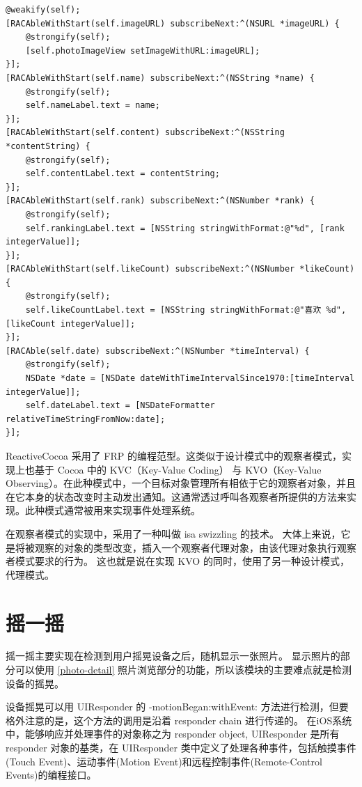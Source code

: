 \begin{minipage}{\textwidth}
\begin{lstlisting}[caption=排行榜中的数据绑定,label=ranking-rack]
@weakify(self);
[RACAbleWithStart(self.imageURL) subscribeNext:^(NSURL *imageURL) {
    @strongify(self);
    [self.photoImageView setImageWithURL:imageURL];
}];
[RACAbleWithStart(self.name) subscribeNext:^(NSString *name) {
    @strongify(self);
    self.nameLabel.text = name;
}];
[RACAbleWithStart(self.content) subscribeNext:^(NSString *contentString) {
    @strongify(self);
    self.contentLabel.text = contentString;
}];
[RACAbleWithStart(self.rank) subscribeNext:^(NSNumber *rank) {
    @strongify(self);
    self.rankingLabel.text = [NSString stringWithFormat:@"%d", [rank integerValue]];
}];
[RACAbleWithStart(self.likeCount) subscribeNext:^(NSNumber *likeCount) {
    @strongify(self);
    self.likeCountLabel.text = [NSString stringWithFormat:@"喜欢 %d", [likeCount integerValue]];
}];
[RACAble(self.date) subscribeNext:^(NSNumber *timeInterval) {
    @strongify(self);
    NSDate *date = [NSDate dateWithTimeIntervalSince1970:[timeInterval integerValue]];
    self.dateLabel.text = [NSDateFormatter relativeTimeStringFromNow:date];
}];
\end{lstlisting}
\end{minipage}

ReactiveCocoa 采用了 FRP 的编程范型。这类似于设计模式中的观察者模式，实现上也基于 Cocoa 中的 KVC（Key-Value Coding） 与 KVO（Key-Value Observing）。在此种模式中，一个目标对象管理所有相依于它的观察者对象，并且在它本身的状态改变时主动发出通知。这通常透过呼叫各观察者所提供的方法来实现。此种模式通常被用来实现事件处理系统。

在观察者模式的实现中，采用了一种叫做 isa swizzling 的技术。
大体上来说，它是将被观察的对象的类型改变，插入一个观察者代理对象，由该代理对象执行观察者模式要求的行为。
这也就是说在实现 KVO 的同时，使用了另一种设计模式，代理模式。

\section{摇一摇}

摇一摇主要实现在检测到用户摇晃设备之后，随机显示一张照片。
显示照片的部分可以使用 \ref{photo-detail} 照片浏览部分的功能，所以该模块的主要难点就是检测设备的摇晃。

设备摇晃可以用 UIResponder 的 -motionBegan:withEvent: 方法进行检测，但要格外注意的是，这个方法的调用是沿着 responder chain 进行传递的。
在iOS系统中，能够响应并处理事件的对象称之为 responder object, UIResponder 是所有 responder 对象的基类，在 UIResponder 类中定义了处理各种事件，包括触摸事件(Touch Event)、运动事件(Motion Event)和远程控制事件(Remote-Control Events)的编程接口。

